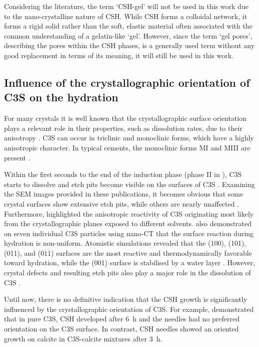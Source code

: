 Considering the literature, the term `\ac{CSH}-gel' will not be used in this work due to the nano-crystalline nature of \ac{CSH}.
While \ac{CSH} forms a colloidal network, it forms a rigid solid rather than the soft, elastic material often associated with the common understanding of a gelatin-like `gel'.
However, since the term `gel pores', describing the pores within the \ac{CSH} phases, is a generally used term without any good replacement in terms of its meaning, it will still be used in this work.

\subsection{Influence of the crystallographic orientation of \acs*{C3S} on the hydration}
\label{subsec:C3S_cryst_orient_lit}

For many crystals it is well known that the crystallographic surface orientation plays a relevant role in their properties, such as dissolution rates, due to their anisotropy \cite{godinho.2012, prajapati.2021}.
\ac{C3S} can occur in triclinic and monoclinic forms, which have a highly anisotropic character.
In typical cements, the monoclinic forms MI and MIII are present \cite{denoirfontaine.2012}.

Within the first seconds to the end of the induction phase (phase II in ), \ac{C3S} starts to dissolve and etch pits become visible on the surfaces of \ac{C3S} \cite{scrivener.2011, juilland.2015, nicoleau.2016, tang.2023}.
Examining the \ac{SEM} images provided in these publications, it becomes obvious that some crystal surfaces show extensive etch pits, while others are nearly unaffected \cite{scrivener.2011, nicoleau.2016, tang.2023}.
Furthermore, \textcite{juilland.2015} highlighted the anisotropic reactivity of \ac{C3S} originating most likely from the crystallographic planes exposed to different solvents.
\textcite{hu.2016a} also demonstrated on seven individual \ac{C3S} particles using nano-\ac{CT} that the surface reaction during hydration is non-uniform.
Atomistic simulations revealed that the (100), (101), (011), and ($0\overline{1}\overline{1}$) surfaces are the most reactive and thermodynamically favorable toward hydration, while the (001) surface is stabilised by a water layer \cite{salahuddin.2019}.
However, crystal defects and resulting etch pits also play a major role in the dissolution of \ac{C3S} \cite{martin.2024}.

Until now, there is no definitive indication that the \ac{CSH} growth is significantly influenced by the crystallographic orientation of \ac{C3S}.
For example, \textcite{stark.2007} demonstrated that in pure \ac{C3S}, \ac{CSH} developed after \qty{6}{\hour} and the needles had no preferred orientation on the \ac{C3S} surface.
In contrast, \ac{CSH} needles showed an oriented growth on calcite in \ac{C3S}-calcite mixtures after \qty{3}{\hour}.

